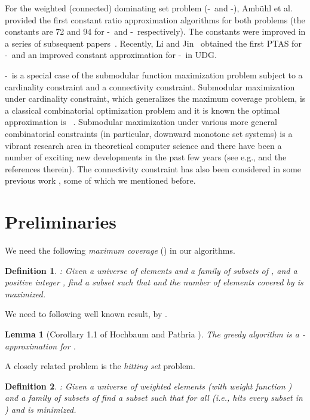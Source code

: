 \documentclass[11pt]{article}
\newcommand{\rednote}[1]{#1}
\newcommand{\minwcds}{-}
\newcommand{\minwds}{-}
\newcommand{\bcsc}{-}
\newcommand{\bsc}{}
\newcommand{\hittingset}{}
\newtheorem{lemma}{Lemma}
\newtheorem{definition}{Definition}
\begin{document}
For the weighted (connected) dominating set problem (\minwds\ and \minwcds), Amb{\"u}hl et al.~\cite{ambuhl2006constant} \rednote{provided} the first constant ratio approximation algorithms for both problems (the constants are 72 and 94 for \minwds\ and \minwcds\ respectively).
The constants were improved in a series of subsequent
papers~\cite{huang2009better,dai20095+,zou2011new,willsonbetter}. Recently, Li and Jin~\cite{li2015ptas} 
\rednote{obtained} the first PTAS
for \minwds\ and an improved constant approximation for \minwcds\ in UDG.

\bcsc\ is a special case of the submodular function maximization problem subject to a
cardinality constraint and a connectivity constraint.
Submodular maximization under cardinality constraint,
which generalizes the maximum coverage problem, is a classical combinatorial optimization problem and it is known the optimal approximation is ~\cite{nemhauser1978analysis,feige1998threshold}.
Submodular maximization under various more general combinatorial constraints (in particular, downward monotone set systems)
is a vibrant research area in theoretical computer science
and there have been a number of exciting new developments in the past few years
(see e.g., \cite{calinescu2011maximizing,vondrak2011submodular} and the references therein).
The connectivity constraint has also been considered in some previous work \cite{zhang2012complexity,kuo2013maximizing,khuller2014analyzing}, some of which we mentioned before.


\section{Preliminaries}
\label{sec:prel}

We need the following \emph{maximum coverage} (\bsc) in our algorithms.
\begin{definition}
	\bsc: Given a universe  of elements and a family  of subsets of , and a positive integer ,
	find a subset 
	such that  and the number of elements covered by
	 is maximized.
\end{definition}
We need to following well known result, by \cite{nemhauser1978analysis,hochbaum1998analysis}.
\begin{lemma}[Corollary 1.1 of  Hochbaum and Pathria \cite{hochbaum1998analysis}]
	The greedy algorithm is a -approximation for \bsc .
	\label{lm_bsc}
\end{lemma}

A closely related problem is the {\em hitting set} problem.
\begin{definition}
	\hittingset: Given a universe  of weighted elements (with weight function )
	and a family  of subsets of 
	find a subset 
	such that  for all  (i.e.,  hits every subset in ) and
	 is minimized.
\end{definition}
\end{document}
